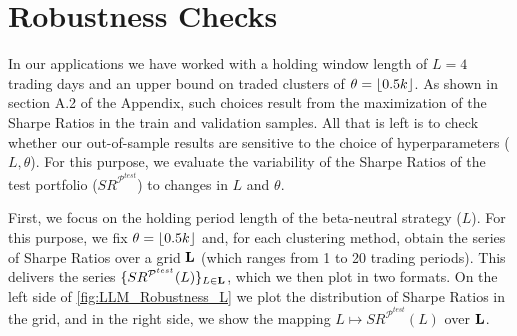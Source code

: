 
\section{Robustness Checks}

\hspace{0.5cm} In our applications we have worked with a holding window length of $L=4$ trading days and an upper bound on traded clusters of $\theta=\lfloor 0.5k \rfloor$. As shown in section A.2 of the Appendix, such choices result from the maximization of the Sharpe Ratios in the train and validation samples. All that is left is to check whether our out-of-sample results are sensitive to the choice of hyperparameters ($L,\theta$). For this purpose, we evaluate the variability of the Sharpe Ratios of the test portfolio ($SR^{\mathcal P^{test}}$) to changes in $L$ and $\theta$. 

\bx 
First, we focus on the holding period length of the beta-neutral strategy ($L$). For this purpose, we fix $\theta=\lfloor 0.5k \rfloor$ and, for each clustering method, obtain the series of Sharpe Ratios over a grid $\mathbf L$ (which ranges from 1 to 20 trading periods). This delivers the series $\{SR^{\mathcal P ^{test}} (L)\}_{L\in\mathbf L}$, which we then plot in two formats. On the left side of \cref{fig:LLM_Robustness_L} we plot the distribution of Sharpe Ratios in the grid, and in the right side, we show the mapping $L\mapsto SR^{\mathcal P ^{test}} (L)$ over $\mathbf L$. 


